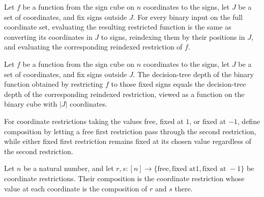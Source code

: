 \begin{theorem}
\label{FABL.restrictedBinaryFunction_eq_comp_reindexedSignRestriction}
\leanok
{}
Let $f$ be a function from the sign cube on $n$ coordinates to the signs, let $J$ be a
set of coordinates, and fix signs outside $J$. For every binary input on the full
coordinate set, evaluating the resulting restricted function is the same as converting
its coordinates in $J$ to signs, reindexing them by their positions in $J$, and
evaluating the corresponding reindexed restriction of $f$.
\end{theorem}

\begin{theorem}
\label{FABL.restrictedDecisionTreeDepth_eq_reindexedSignRestriction}
\leanok
{}
Let $f$ be a function from the sign cube on $n$ coordinates to the signs, let $J$ be a
set of coordinates, and fix signs outside $J$. The decision-tree depth of the binary
function obtained by restricting $f$ to those fixed signs equals the decision-tree depth
of the corresponding reindexed restriction, viewed as a function on the binary cube with
$|J|$ coordinates.
\end{theorem}

\begin{definition}
\label{FABL.CoordRestriction.compose}
\leanok
{}
For coordinate restrictions taking the values free, fixed at $1$, or fixed at $-1$,
define composition by letting a free first restriction pass through the second
restriction, while either fixed first restriction remains fixed at its chosen value
regardless of the second restriction.
\end{definition}

\begin{definition}
\label{FABL.composeCoordRestrictions}
\leanok
{}
Let $n$ be a natural number, and let $r,s:[n]\to\{\text{free},\text{fixed at
}1,\text{fixed at }-1\}$ be coordinate restrictions. Their composition is the coordinate
restriction whose value at each coordinate is the composition of $r$ and $s$ there.
\end{definition}

